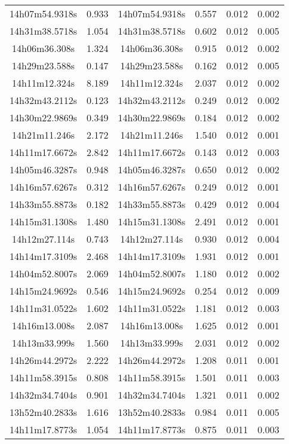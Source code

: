 \begin{table}
\begin{tabular}{cccccc}
14h07m54.9318s & 0.933 & 14h07m54.9318s & 0.557 & 0.012 & 0.002 \\
14h31m38.5718s & 1.054 & 14h31m38.5718s & 0.602 & 0.012 & 0.005 \\
14h06m36.308s & 1.324 & 14h06m36.308s & 0.915 & 0.012 & 0.002 \\
14h29m23.588s & 0.147 & 14h29m23.588s & 0.162 & 0.012 & 0.005 \\
14h11m12.324s & 8.189 & 14h11m12.324s & 2.037 & 0.012 & 0.002 \\
14h32m43.2112s & 0.123 & 14h32m43.2112s & 0.249 & 0.012 & 0.002 \\
14h30m22.9869s & 0.349 & 14h30m22.9869s & 0.184 & 0.012 & 0.002 \\
14h21m11.246s & 2.172 & 14h21m11.246s & 1.540 & 0.012 & 0.001 \\
14h11m17.6672s & 2.842 & 14h11m17.6672s & 0.143 & 0.012 & 0.003 \\
14h05m46.3287s & 0.948 & 14h05m46.3287s & 0.650 & 0.012 & 0.002 \\
14h16m57.6267s & 0.312 & 14h16m57.6267s & 0.249 & 0.012 & 0.001 \\
14h33m55.8873s & 0.182 & 14h33m55.8873s & 0.429 & 0.012 & 0.004 \\
14h15m31.1308s & 1.480 & 14h15m31.1308s & 2.491 & 0.012 & 0.001 \\
14h12m27.114s & 0.743 & 14h12m27.114s & 0.930 & 0.012 & 0.004 \\
14h14m17.3109s & 2.468 & 14h14m17.3109s & 1.931 & 0.012 & 0.001 \\
14h04m52.8007s & 2.069 & 14h04m52.8007s & 1.180 & 0.012 & 0.002 \\
14h15m24.9692s & 0.546 & 14h15m24.9692s & 0.254 & 0.012 & 0.009 \\
14h11m31.0522s & 1.602 & 14h11m31.0522s & 1.181 & 0.012 & 0.003 \\
14h16m13.008s & 2.087 & 14h16m13.008s & 1.625 & 0.012 & 0.001 \\
14h13m33.999s & 1.560 & 14h13m33.999s & 2.031 & 0.012 & 0.002 \\
14h26m44.2972s & 2.222 & 14h26m44.2972s & 1.208 & 0.011 & 0.001 \\
14h11m58.3915s & 0.808 & 14h11m58.3915s & 1.501 & 0.011 & 0.003 \\
14h32m34.7404s & 0.901 & 14h32m34.7404s & 1.321 & 0.011 & 0.002 \\
13h52m40.2833s & 1.616 & 13h52m40.2833s & 0.984 & 0.011 & 0.005 \\
14h11m17.8773s & 1.054 & 14h11m17.8773s & 0.875 & 0.011 & 0.003 \\

\end{tabular}
\end{table}
